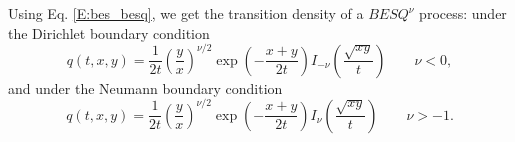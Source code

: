 Using Eq. \ref{E:bes_besq}, we get the transition density of a $BESQ^{\nu}$
process: under the Dirichlet boundary condition
\begin{equation}
  q(t,x,y) = \frac{1}{2t} \left( \frac{y}{x} \right)^{\nu/2} 
     \exp\left( -\frac{x+y}{2t} \right)
    I_{-\nu} \left( \frac{\sqrt{xy}}{t} \right) \qquad \nu<0,
\end{equation}
and under the Neumann boundary condition
\begin{equation}
  q(t,x,y) = \frac{1}{2t} \left( \frac{y}{x} \right)^{\nu/2} 
     \exp\left( -\frac{x+y}{2t} \right)
      I_{\nu} \left( \frac{\sqrt{xy}}{t} \right) \qquad \nu>-1.
\end{equation}

